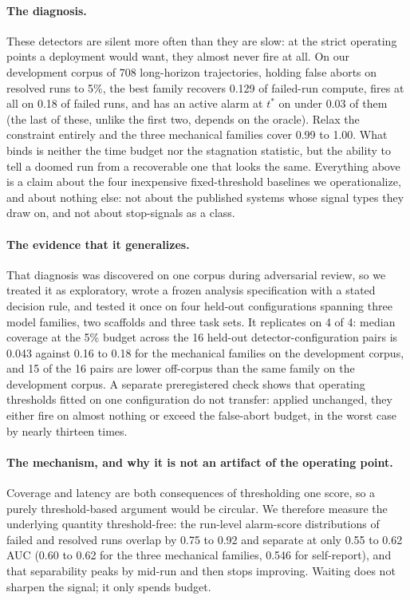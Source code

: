 \documentclass[sigconf,screen]{acmart}
\begin{document}
\paragraph{The diagnosis.} These detectors are silent more often than they are slow: at the strict operating points a
deployment would want, they almost never fire at all. On our development corpus of 708
long-horizon trajectories, holding false aborts on resolved runs to 5\%, the best family recovers
0.129 of failed-run compute, fires at all on 0.18 of failed runs, and has an active alarm at $t^{*}$
on under 0.03 of them (the last of these, unlike the first two, depends on the oracle). Relax the
constraint entirely and the three mechanical families cover 0.99 to 1.00. What binds is neither the time budget nor the
stagnation statistic, but the ability to tell a doomed run from a recoverable one that looks the
same. Everything above is a claim about the four inexpensive fixed-threshold baselines we
operationalize, and about nothing else: not about the published systems whose signal types they
draw on, and not about stop-signals as a class.

\paragraph{The evidence that it generalizes.} That diagnosis was discovered on one corpus during
adversarial review, so we treated it as exploratory, wrote a frozen analysis
specification with a stated decision rule, and tested it once on four held-out configurations
spanning three model families, two scaffolds and three task sets. It replicates on 4 of 4: median
coverage at the 5\% budget across the 16 held-out detector-configuration pairs is 0.043 against 0.16
to 0.18 for the mechanical families on the development corpus, and 15 of the 16 pairs are lower off-corpus than the same family
on the development corpus. A
separate preregistered check shows that operating thresholds fitted on one configuration do not
transfer: applied unchanged, they either fire on almost nothing or exceed the false-abort budget,
in the worst case by nearly thirteen times.

\paragraph{The mechanism, and why it is not an artifact of the operating point.} Coverage and
latency are both consequences of thresholding one score, so a purely threshold-based argument would
be circular. We therefore measure the underlying quantity threshold-free: the run-level alarm-score
distributions of failed and resolved runs overlap by 0.75 to 0.92 and separate at only 0.55 to 0.62
AUC (0.60 to 0.62 for the three mechanical families, 0.546 for self-report), and that separability
peaks by mid-run and then stops improving. Waiting does not sharpen the signal; it only spends
budget.
\end{document}
